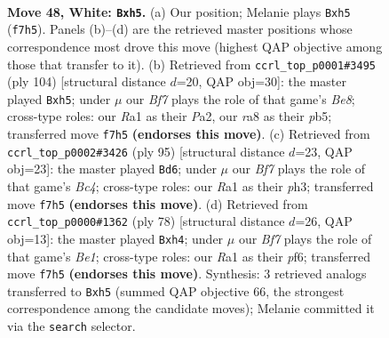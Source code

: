 \documentclass[11pt]{article}
\begin{document}
\clearpage

\begin{figure}[p]\centering
\begin{subfigure}{0.46\textwidth}\centering
\resizebox{\linewidth}{!}{%
\newchessgame
\chessboard[
  setfen={r7/1p3BR1/p7/4k2p/bP1r4/P6K/8/R7 w - - 0 48},
  showmover=false,
  pgfstyle=straightmove, color=movearrow, markmove={f7-h5}
]}
\caption{}
\end{subfigure}\hfill
\begin{subfigure}{0.46\textwidth}\centering
\resizebox{\linewidth}{!}{%
\newchessgame
\chessboard[
  setfen={R3B3/6bk/2pr4/1p4Pp/4p3/6K1/P4P2/8 w - - 4 53},
  showmover=false,
  pgfstyle=straightmove, color=movearrow, markmove={e8-h5}
]}
\caption{}
\end{subfigure}
\\[4pt]
\begin{subfigure}{0.46\textwidth}\centering
\resizebox{\linewidth}{!}{%
\newchessgame
\chessboard[
  setfen={2r1k3/1R3p1p/6p1/2b3B1/6P1/7P/5PK1/8 b - - 16 48},
  showmover=false,
  pgfstyle=straightmove, color=movearrow, markmove={c5-d6}
]}
\caption{}
\end{subfigure}\hfill
\begin{subfigure}{0.46\textwidth}\centering
\resizebox{\linewidth}{!}{%
\newchessgame
\chessboard[
  setfen={8/1p3k2/5p2/1b6/7p/P4P1K/2r3P1/3RB3 w - - 4 40},
  showmover=false,
  pgfstyle=straightmove, color=movearrow, markmove={e1-h4}
]}
\caption{}
\end{subfigure}
\caption{\textbf{Move 48, White: \texttt{Bxh5}.} (a) Our position; Melanie plays \texttt{Bxh5} (\texttt{f7h5}). Panels (b)--(d) are the retrieved master positions whose correspondence most drove this move (highest QAP objective among those that transfer to it). (b) Retrieved from \texttt{ccrl\_top\_p0001\#3495} (ply 104) [structural distance $d$=20, QAP obj=30]: the master played \texttt{Bxh5}; under $\mu$ our \emph{Bf7} plays the role of that game's \emph{Be8}; cross-type roles: our \emph{R}a1 as their \emph{P}a2, our \emph{r}a8 as their \emph{p}b5; transferred move \texttt{f7h5} \textbf{(endorses this move)}. (c) Retrieved from \texttt{ccrl\_top\_p0002\#3426} (ply 95) [structural distance $d$=23, QAP obj=23]: the master played \texttt{Bd6}; under $\mu$ our \emph{Bf7} plays the role of that game's \emph{Bc4}; cross-type roles: our \emph{R}a1 as their \emph{p}h3; transferred move \texttt{f7h5} \textbf{(endorses this move)}. (d) Retrieved from \texttt{ccrl\_top\_p0000\#1362} (ply 78) [structural distance $d$=26, QAP obj=13]: the master played \texttt{Bxh4}; under $\mu$ our \emph{Bf7} plays the role of that game's \emph{Be1}; cross-type roles: our \emph{R}a1 as their \emph{p}f6; transferred move \texttt{f7h5} \textbf{(endorses this move)}. Synthesis: 3 retrieved analogs transferred to \texttt{Bxh5} (summed QAP objective 66, the strongest correspondence among the candidate moves); Melanie committed it via the \texttt{search} selector.}
\label{fig:thought-m94}
\end{figure}
\end{document}
